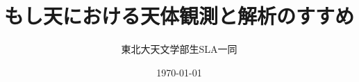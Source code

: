 \RequirePackage[normalem]{ulem} %
\RequirePackage{color} %
\providecommand{\MyDIFadd}[1]{{\protect\color{blue}\uwave{#1}}} %
\providecommand{\MyDIFdel}[1]{{\protect\color{red}\sout{#1}}}                      %
\providecommand{\MyDIFaddbegin}{} %
\providecommand{\MyDIFaddend}{} %
\providecommand{\MyDIFdelbegin}{} %
\providecommand{\MyDIFdelend}{} %
\providecommand{\MyDIFaddFL}[1]{\MyDIFadd{#1}} %
\providecommand{\MyDIFdelFL}[1]{\MyDIFdel{#1}} %
\providecommand{\MyDIFaddbeginFL}{} %
\providecommand{\MyDIFaddendFL}{} %
\providecommand{\MyDIFdelbeginFL}{} %
\providecommand{\MyDIFdelendFL}{} %



\newcommand{\bs}{\symbol{92}} %
\newcommand{\red}[1]{\textcolor{red}{#1}} %
\newcommand{\blue}[1]{\textcolor{blue}{#1}} %
\newcommand{\green}[1]{\textcolor{green}{#1}} %
\newcommand{\ured}[1]{\textcolor{red}{\underline{\textcolor{black}{#1}}}} %
\newcommand{\ublue}[1]{\textcolor{blue}{\underline{\textcolor{black}{#1}}}} %
\newcommand{\ugreen}[1]{\textcolor{green}{\underline{\textcolor{black}{#1}}}} %

\title{もし天における天体観測と解析のすすめ}
\date{\today} %
\author{東北大天文学部生SLA一同} %
